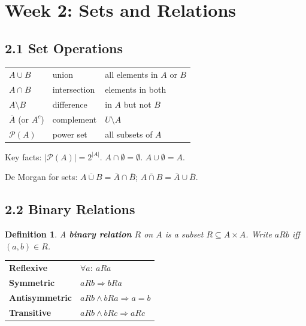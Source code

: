 \documentclass[11pt]{article}
\newtheorem{definition}{Definition}[section]
\begin{document}
\section{Week 2: Sets and Relations}
\setcounter{definition}{0}

\subsection*{2.1 Set Operations}

\begin{tcolorbox}[keybox={Core operations}]
\begin{tabular}{@{}lll@{}}
$A\cup B$ & union & all elements in $A$ or $B$\\
$A\cap B$ & intersection & elements in both\\
$A\setminus B$ & difference & in $A$ but not $B$\\
$\bar{A}$ (or $A^c$) & complement & $U\setminus A$\\
$\mathcal{P}(A)$ & power set & all subsets of $A$\\
\end{tabular}
\end{tcolorbox}

Key facts: $|\mathcal{P}(A)|=2^{|A|}$. \quad $A\cap\emptyset=\emptyset$. \quad $A\cup\emptyset=A$.

De Morgan for sets: $\overline{A\cup B}=\bar{A}\cap\bar{B}$; \quad $\overline{A\cap B}=\bar{A}\cup\bar{B}$.

\subsection*{2.2 Binary Relations}

\begin{definition}
A \textbf{binary relation} $R$ on $A$ is a subset $R\subseteq A\times A$. Write $aRb$ iff $(a,b)\in R$.
\end{definition}

\begin{tcolorbox}[keybox={Properties}]
\begin{tabular}{@{}ll@{}}
\textbf{Reflexive}     & $\forall a:\ aRa$\\
\textbf{Symmetric}     & $aRb\Rightarrow bRa$\\
\textbf{Antisymmetric} & $aRb\land bRa\Rightarrow a=b$\\
\textbf{Transitive}    & $aRb\land bRc\Rightarrow aRc$\\
\end{tabular}
\end{tcolorbox}
\end{document}
